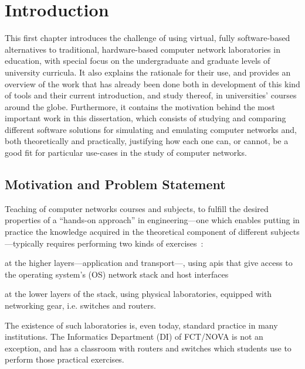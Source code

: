 
\chapter{Introduction}
\label{ch:introduction}

This first chapter introduces the challenge of using virtual, fully software-based alternatives to traditional, hardware-based computer network laboratories in education, with special focus on the undergraduate and graduate levels of university curricula.
It also explains the rationale for their use, and provides an overview of the work that has already been done both in development of this kind of tools and their current introduction, and study thereof, in universities' courses around the globe.
Furthermore, it contains the motivation behind the most important work in this dissertation, which consists of studying and comparing different software solutions for simulating and emulating computer networks and, both theoretically and practically, justifying how each one can, or cannot, be a good fit for particular use-cases in the study of computer networks.

\section{Motivation and Problem Statement}
\label{sec:motivation}

Teaching of computer networks courses and subjects, to fulfill the desired properties of a ``hands-on approach'' in engineering---one which enables putting in practice the knowledge acquired in the theoretical component of different subjects---typically requires performing two kinds of exercises~\cite{problembasedlearning}:
  \begin{enumerate*}[label=(\roman*), itemjoin={{, }}, itemjoin*={{, and }}]
  \item at the higher layers---application and transport---, using \glspl{api} that give access to the operating system's (OS) network stack and host interfaces
  \item at the lower layers of the stack, using physical laboratories, equipped with networking gear, i.e. switches and routers.
  \end{enumerate*}
The existence of such laboratories is, even today, standard practice in many institutions.
The Informatics Department (DI) of FCT/NOVA is not an exception, and has a classroom with routers and switches which students use to perform those practical exercises.

